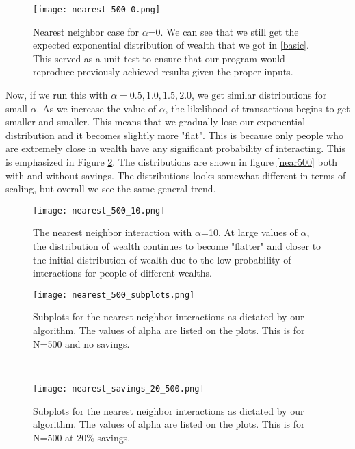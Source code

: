 \documentclass[11pt]{article}
\begin{document}
	\begin{figure}[h!]
		\centering
		\texttt{[image: nearest\_500\_0.png]}
		\caption{Nearest neighbor case for $\alpha$=0. We can see that we still get the expected exponential distribution of wealth that we got in \ref{basic}. This served as a unit test to ensure that our program would reproduce previously achieved results given the proper inputs.}
		\label{alpha0}
	\end{figure}
	
	Now, if we run this with $\alpha=0.5,1.0,1.5,2.0$, we get similar distributions for small $\alpha$. As we increase the value of $\alpha$, the likelihood of transactions begins to get smaller and smaller. This means that we gradually lose our exponential distribution and it becomes slightly more "flat". This is because only people who are extremely close in wealth have any significant probability of interacting. This is emphasized in Figure \ref{bigalpha}. The distributions are shown in figure \ref{near500} both with and without savings. The distributions looks somewhat different in terms of scaling, but overall we see the same general trend. 
	
	\begin{figure}
		\centering
		\texttt{[image: nearest\_500\_10.png]}
		\caption{The nearest neighbor interaction with $\alpha$=10. At large values of $\alpha$, the distribution of wealth continues to become "flatter" and closer to the initial distribution of wealth due to the low probability of interactions for people of different wealths.}
		\label{bigalpha}
	\end{figure}
	
	\begin{figure*}[h!]
		\centering
		\begin{subfigure}{0.45\linewidth}
			\texttt{[image: nearest\_500\_subplots.png]}
			\caption{Subplots for the nearest neighbor interactions as dictated by our algorithm. The values of alpha are listed on the plots. This is for N=500 and no savings.}
		\end{subfigure}
		~
		\begin{subfigure}{0.45\linewidth}
			\texttt{[image: nearest\_savings\_20\_500.png]}
			\caption{Subplots for the nearest neighbor interactions as dictated by our algorithm. The values of alpha are listed on the plots. This is for N=500 at 20\% savings.}
		\end{subfigure}
		\caption{The above plots show the nearest neighbor wealth distribution for N=500 with and without savings.}
		\label{near500}
	\end{figure*}
	
\end{document}
